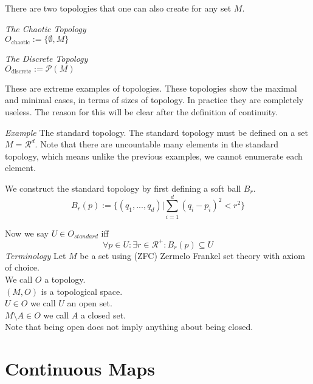 \documentclass{article}
\begin{document}
	\noindent There are two topologies that one can also create for any set $M$.

	\noindent\textit{The Chaotic Topology} \\
	$ O_{\textrm{chaotic}} := \{\emptyset, M\}$
	
	\noindent\textit{The Discrete Topology}\\
	$ O_{\textrm{discrete}} := \mathscr{P}(M) $

	\noindent These are extreme examples of topologies. These topologies show the maximal
	and minimal cases, in terms of sizes of topology. In practice they are completely
	useless. The reason for this will be clear after the definition of continuity.

	\noindent\textit{Example} The standard topology. 
	The standard topology must be defined on a set $M =\mathscr{R}^d$. Note that there 
	are uncountable many elements in the standard topology, which means unlike
	the previous examples, we cannot enumerate each element.

	\noindent We construct the standard topology by first defining a soft ball $B_r$.
	$$ B_r(p) := \{(q_1,...,q_d) | \sum_{i=1}^{d} (q_i-p_i)^2 < r^2\} $$

	\noindent Now we say $U\in O_{standard}$ iff
	$$ \forall p\in U: \exists r\in \mathscr{R}^+ : B_r(p) \subseteq U $$
	\vspace{0.25cm}
	\noindent\textit{Terminology}
	Let $M$ be a set using (ZFC) Zermelo Frankel set theory with axiom of choice.\\
	We call $O$ a topology.\\
	$(M, O)$ is a topological space.\\
	$U\in O$ we call $U$ an open set.\\
	$M\textrm{\textbackslash} A\in O$ we call $A$ a closed set.\\
	Note that being open does not imply anything about being closed.

	\section{Continuous Maps}
\end{document}
